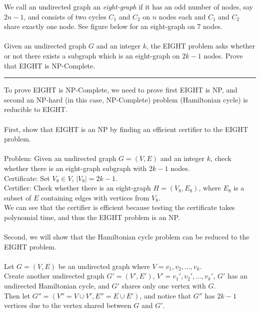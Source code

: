 \documentclass[11pt]{article}
\begin{document}

\item We call an undirected graph an \emph{eight-graph} if it has
      an odd number of nodes, say $2n-1$, and consists of two cycles
      $C_1$ and $C_2$ on $n$ nodes each and $C_1$ and $C_2$ share
      exactly one node. See figure below for an eight-graph on $7$
      nodes.\\
      \\
      Given an undirected graph $G$ and an integer $k$, the EIGHT problem asks whether or not there exists a subgraph which is an eight-graph on $2k-1$ nodes. Prove that EIGHT is NP-Complete.
      \\
\hrule
\begin{solution}
    \item
    To prove EIGHT is NP-Complete, we need to prove first EIGHT is NP, and second an NP-hard (in this case, NP-Complete) problem (Hamiltonian cycle) is reducible to EIGHT.
    \\
    \\
    First, show that EIGHT is an NP by finding an efficient certifier to the EIGHT problem.\\
    \\
    Problem: Given an undirected graph $G = (V, E)$ and an integer $k$, check whether there is an eight-graph subgraph with $2k-1$ nodes.\\
    Certificate: Set $V_{8} \in V$, $|V_{8}| = 2k-1$.\\
    Certifier: Check whether there is an eight-graph $H = (V_{8}, E_{8})$, where $E_{8}$ is a subset of $E$ containing edges with vertices from $V_{8}$.\\
    We can see that the certifier is efficient because testing the certificate takes polynomial time, and thus the EIGHT problem is an NP.\\
    \\
    Second, we will show that the Hamiltonian cycle problem can be reduced to the EIGHT problem.\\
    \\
    Let $G = (V, E)$ be an undirected graph where $V = {v_1, v_2,...,v_k}$.\\
    Create another undirected graph $G' = (V', E')$, $V' = {v_1', v_2',...,v_k'}$, $G'$ has an undirected Hamiltonian cycle, and $G'$ shares only one vertex with $G$.\\
    Then let $G'' = (V''=V \cup V', E''= E \cup E')$, and notice that $G''$ has $2k-1$ vertices due to the vertex shared between $G$ and $G'$. \\

\end{solution}
\end{document}
